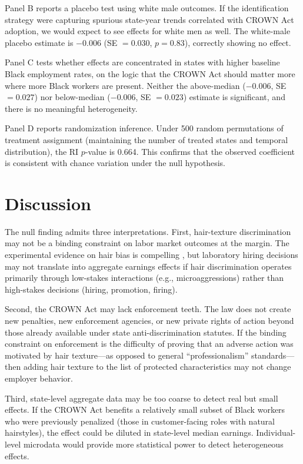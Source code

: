 \documentclass[12pt]{article}
\begin{document}
Panel B reports a placebo test using white male outcomes. If the identification strategy were capturing spurious state-year trends correlated with CROWN Act adoption, we would expect to see effects for white men as well. The white-male placebo estimate is $-0.006$ (SE $= 0.030$, $p = 0.83$), correctly showing no effect.

Panel C tests whether effects are concentrated in states with higher baseline Black employment rates, on the logic that the CROWN Act should matter more where more Black workers are present. Neither the above-median ($-0.006$, SE $= 0.027$) nor below-median ($-0.006$, SE $= 0.023$) estimate is significant, and there is no meaningful heterogeneity.

Panel D reports randomization inference. Under 500 random permutations of treatment assignment (maintaining the number of treated states and temporal distribution), the RI $p$-value is 0.664. This confirms that the observed coefficient is consistent with chance variation under the null hypothesis.


\section{Discussion}
\label{sec:discussion}

The null finding admits three interpretations. First, hair-texture discrimination may not be a binding constraint on labor market outcomes at the margin. The experimental evidence on hair bias is compelling \citep{opie_phillips_2015, rosette_dumas_2007}, but laboratory hiring decisions may not translate into aggregate earnings effects if hair discrimination operates primarily through low-stakes interactions (e.g., microaggressions) rather than high-stakes decisions (hiring, promotion, firing).

Second, the CROWN Act may lack enforcement teeth. The law does not create new penalties, new enforcement agencies, or new private rights of action beyond those already available under state anti-discrimination statutes. If the binding constraint on enforcement is the difficulty of proving that an adverse action was motivated by hair texture---as opposed to general ``professionalism'' standards---then adding hair texture to the list of protected characteristics may not change employer behavior.

Third, state-level aggregate data may be too coarse to detect real but small effects. If the CROWN Act benefits a relatively small subset of Black workers who were previously penalized (those in customer-facing roles with natural hairstyles), the effect could be diluted in state-level median earnings. Individual-level microdata would provide more statistical power to detect heterogeneous effects.
\end{document}

